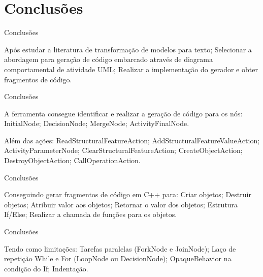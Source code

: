 \documentclass[handout,aspectratio = 169]{beamer}
\begin{document}

\section{Conclusões}

\begin{frame}{Conclusões}
    \begin{outline}
        \1 Após estudar a literatura de transformação de modelos para texto;
        \1 Selecionar a abordagem para geração de código embarcado através de diagrama comportamental de atividade UML; 
        \1 Realizar a implementação do gerador e obter fragmentos de código.
    \end{outline}
\end{frame}

\begin{frame}{Conclusões}
    \begin{outline}
        \1 A ferramenta consegue identificar e realizar a geração de código para os nós:
        \2 InitialNode;
        \2 DecisionNode;
        \2 MergeNode;
        \2 ActivityFinalNode.

        \1 Além das ações:
        \2 ReadStructuralFeatureAction;
        \2 AddStructuralFeatureValueAction;
        \2 ActivityParameterNode;
        \2 ClearStructuralFeatureAction;
        \2 CreateObjectAction;
        \2 DestroyObjectAction;
        \2 CallOperationAction.
    \end{outline}
\end{frame}

\begin{frame}{Conclusões}
    \begin{outline}
        \1 Conseguindo gerar fragmentos de código em C++ para:
        \2 Criar objetos;
        \2 Destruir objetos;
        \2 Atribuir valor aos objetos;
        \2 Retornar o valor dos objetos;
        \2 Estrutura If/Else;
        \2 Realizar a chamada de funções para os objetos.
    \end{outline}
\end{frame}

\begin{frame}{Conclusões}
    \begin{outline}
        \1 Tendo como limitações:
        \2 Tarefas paralelas (ForkNode e JoinNode);
        \2 Laço de repetição While e For (LoopNode ou DecisionNode);
        \2 OpaqueBehavior na condição do If;
        \2 Indentação.
    \end{outline}
\end{frame}
\end{document}
